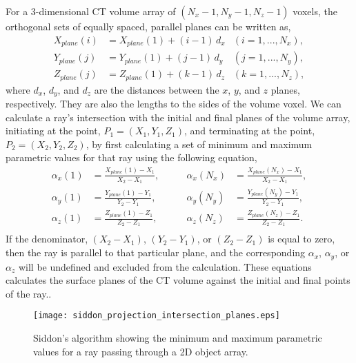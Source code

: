 For a 3-dimensional CT volume array of $(N_x -1, N_y-1, N_z-1)$ voxels, the orthogonal sets of equally spaced, parallel planes can be written as,
%
\begin{equation}
	\begin{aligned}
		X_{plane}(i) & = X_{plane}(1) + (i-1)\, d_x 	&(i = 1, ..., N_x),\\ 
		Y_{plane}(j) & = Y_{plane}(1) + (j-1)\, d_y  	&(j = 1, ..., N_y),\\
		Z_{plane}(j) & = Z_{plane}(1) + (k-1)\, d_z		&(k = 1, ..., N_z),
	\end{aligned}
	\label{eq:siddon_planes}
\end{equation}
%
where $d_x$, $d_y$, and $d_z$ are the distances between the $x$, $y$, and $z$ planes, respectively.  They are also the lengths to the sides of the volume voxel.  We can calculate a ray's intersection with the initial and final planes of the volume array, initiating at the point, $P_1 = (X_1, Y_1, Z_1)$, and terminating at the point, $P_2 = (X_2, Y_2, Z_2)$, by first calculating a set of minimum and maximum parametric values for that ray using the following equation,
%
\begin{equation}
\begin{aligned}
\alpha_x(1) &= \frac{X_{plane}(1) - X_1}{X_2 - X_1}, \qquad &\alpha_x(N_x) &= \frac{X_{plane}(N_x) - X_1}{X_2 - X_1}, \\
\alpha_y(1) &= \frac{Y_{plane}(1) - Y_1}{Y_2 - Y_1}, \qquad &\alpha_y(N_y) &= \frac{Y_{plane}(N_y) - Y_1}{Y_2 - Y_1}, \\
\alpha_z(1) &= \frac{Z_{plane}(1) - Z_1}{Z_2 - Z_1}, \qquad &\alpha_z(N_z) &= \frac{Z_{plane}(N_z) - Z_1}{Z_2 - Z_1}. \\
\end{aligned}
\label{eq:siddon_alpha_extremes}
\end{equation}
%
If the denominator, $(X_2 - X_1)$, $(Y_2-Y_1)$, or $(Z_2 - Z_1)$ is equal to zero, then the ray is parallel to that particular plane, and the corresponding $\alpha_x$, $\alpha_y$, or $\alpha_z$ will be undefined and excluded from the calculation.  These equations calculates the surface planes of the CT volume against the initial and final points of the ray..
%
\begin{figure}[ht]
\centering
\texttt{[image: siddon\_projection\_intersection\_planes.eps]}
\caption{Siddon's algorithm showing the minimum and maximum parametric values for a ray passing through a 2D object array.}
\label{fig:siddon_intersection_planes}
\end{figure}

